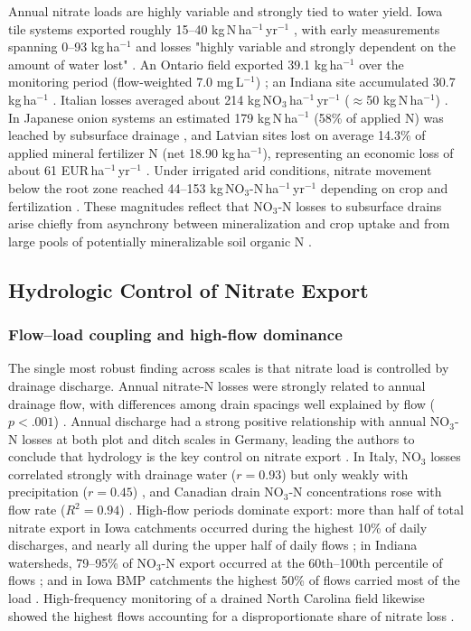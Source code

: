 Annual nitrate loads are highly variable and strongly tied to water yield. Iowa tile systems exported roughly 15--40 kg\,N\,ha$^{-1}$\,yr$^{-1}$ \parencite{Kelley2017,Schilling2012b,Ikenberry2014}, with early measurements spanning 0--93 kg\,ha$^{-1}$ and losses "highly variable and strongly dependent on the amount of water lost" \parencite{BAKER1975}. An Ontario field exported 39.1 kg\,ha$^{-1}$ over the monitoring period (flow-weighted 7.0 mg\,L$^{-1}$) \parencite{Smith2011}; an Indiana site accumulated 30.7 kg\,ha$^{-1}$ \parencite{Williams2022}. Italian losses averaged about 214 kg\,NO$_3$\,ha$^{-1}$\,yr$^{-1}$ ($\approx$50 kg\,N\,ha$^{-1}$) \parencite{ROSSI1991}. In Japanese onion systems an estimated 179 kg\,N\,ha$^{-1}$ (58\% of applied N) was leached by subsurface drainage \parencite{Hayashi1999}, and Latvian sites lost on average 14.3\% of applied mineral fertilizer N (net 18.90 kg\,ha$^{-1}$), representing an economic loss of about 61 EUR\,ha$^{-1}$\,yr$^{-1}$ \parencite{Siksnane2017}. Under irrigated arid conditions, nitrate movement below the root zone reached 44--153 kg\,NO$_3$-N\,ha$^{-1}$\,yr$^{-1}$ depending on crop and fertilization \parencite{ROBBINS1980}. These magnitudes reflect that NO$_3$-N losses to subsurface drains arise chiefly from asynchrony between mineralization and crop uptake and from large pools of potentially mineralizable soil organic N \parencite{Cambardella1999}.

\subsection{Hydrologic Control of Nitrate Export}

\subsubsection{Flow--load coupling and high-flow dominance}

The single most robust finding across scales is that nitrate load is controlled by drainage discharge. Annual nitrate-N losses were strongly related to annual drainage flow, with differences among drain spacings well explained by flow ($p<.001$) \parencite{Kladivko2021}. Annual discharge had a strong positive relationship with annual NO$_3$-N losses at both plot and ditch scales in Germany, leading the authors to conclude that hydrology is the key control on nitrate export \parencite{Bauwe2020}. In Italy, NO$_3$ losses correlated strongly with drainage water ($r=0.93$) but only weakly with precipitation ($r=0.45$) \parencite{ROSSI1991}, and Canadian drain NO$_3$-N concentrations rose with flow rate ($R^2=0.94$) \parencite{Smith2011}. High-flow periods dominate export: more than half of total nitrate export in Iowa catchments occurred during the highest 10\% of daily discharges, and nearly all during the upper half of daily flows \parencite{Ikenberry2014}; in Indiana watersheds, 79--95\% of NO$_3$-N export occurred at the 60th--100th percentile of flows \parencite{Speir2021}; and in Iowa BMP catchments the highest 50\% of flows carried most of the load \parencite{Law2022}. High-frequency monitoring of a drained North Carolina field likewise showed the highest flows accounting for a disproportionate share of nitrate loss \parencite{Liu2020}.

